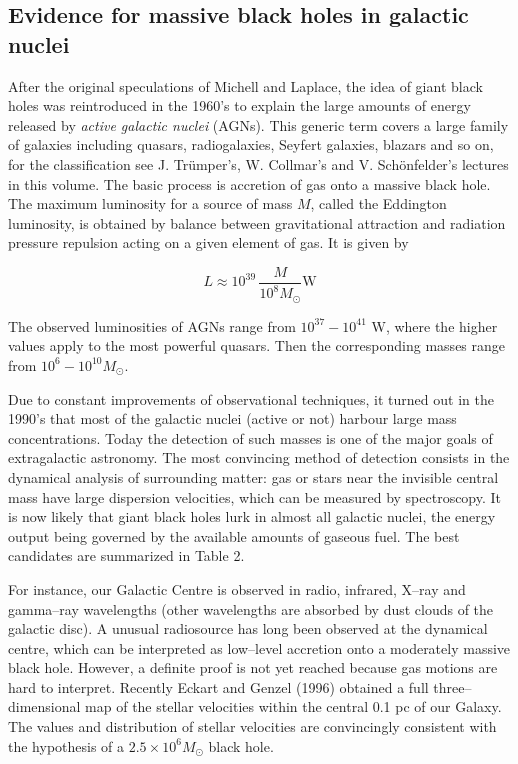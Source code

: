 \documentclass{lamuphys}
\begin{document}
 
\subsection {Evidence for massive black holes in galactic nuclei}

After the original speculations of Michell and Laplace, the idea of 
giant black holes was reintroduced in the 1960's to explain the 
large amounts of energy released by {\it active galactic nuclei} (AGNs). This 
generic term covers a large family of galaxies including quasars, 
radiogalaxies, Seyfert galaxies, blazars and so on, for the 
classification  see J. Tr\"umper's, W. Collmar's and V. Sch\"onfelder's
lectures in this volume.
The basic process is accretion of gas onto a massive 
black hole. The maximum luminosity for a source of mass $M$, called 
the Eddington luminosity, is obtained by balance between 
gravitational attraction and radiation pressure repulsion acting on a 
given element of gas. It is given by 

\begin{equation}
L \approx 10^{39} \, \frac{M}{10^{8}M_{\odot}} \textrm{W}
        \label{luminet:16}
\end{equation}

The observed luminosities of AGNs range from $10^{37} -10^{41}$ 
W, where the higher values apply to the most powerful 
quasars.  Then the corresponding masses range from $10^{6} - 
10^{10} M_{\odot}$. 

Due to constant improvements of 
observational techniques, it turned out in the 1990's that most of the galactic 
nuclei (active or not)  harbour large mass concentrations. Today the 
detection of such masses is one of the major goals of  
extragalactic astronomy. The most convincing method of detection consists in 
the dynamical analysis of surrounding matter: gas or stars near 
the invisible central mass have large dispersion velocities, which can 
be measured by spectroscopy. It is now likely that giant black holes 
lurk in almost all galactic nuclei, the energy output 
being governed by the available amounts of gaseous fuel. The best 
candidates are summarized in Table 2. 

For instance, our Galactic Centre is observed in radio, infrared, X--ray and gamma--ray 
wavelengths (other wavelengths are absorbed by dust clouds of 
the galactic disc). A unusual radiosource has long been observed at 
the dynamical centre, which can be interpreted as low--level accretion 
onto a moderately massive black hole. However, a definite proof is not yet 
reached because gas motions are hard to interpret. Recently Eckart 
and Genzel (1996) obtained a full three--dimensional map of the 
stellar velocities within the central 0.1 pc of our Galaxy. The 
values and distribution of stellar velocities are convincingly 
consistent with the  hypothesis of a $2.5 \times 10^{6} M_{\odot}$ black 
hole.
\end{document}
